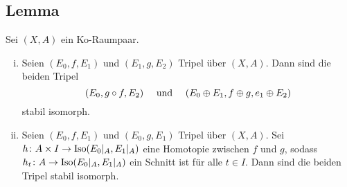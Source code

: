 \subsection{Lemma} %
\label{sub:34}
Sei $(X,A)$ ein Ko-Raumpaar.
\begin{enumerate}[(i)]
	\item Seien $(E_0,f,E_1)$ und $(E_1,g,E_2)$ Tripel über $(X,A)$. Dann sind die beiden Tripel 
	\[
		(E_0,g \circ f, E_2) \quad  \text{ und } \quad \enbrace*{E_0 \oplus E_1, f \oplus g, e_1 \oplus E_2} 
	\]
	stabil isomorph.
	\item Seien $(E_0,f,E_1)$ und $(E_0,g,E_1)$ Tripel über $(X,A)$. Sei $h \colon A \times I \to \Iso \enbrace*{E_0|_A,E_1|_A} $ eine Homotopie zwischen $f$ und $g$, sodass 
	$h_t \colon A \to \Iso \enbrace*{E_0|_A,E_1|_A}$ ein Schnitt ist für alle $t \in I$. Dann sind die beiden Tripel stabil isomorph.
\end{enumerate}
